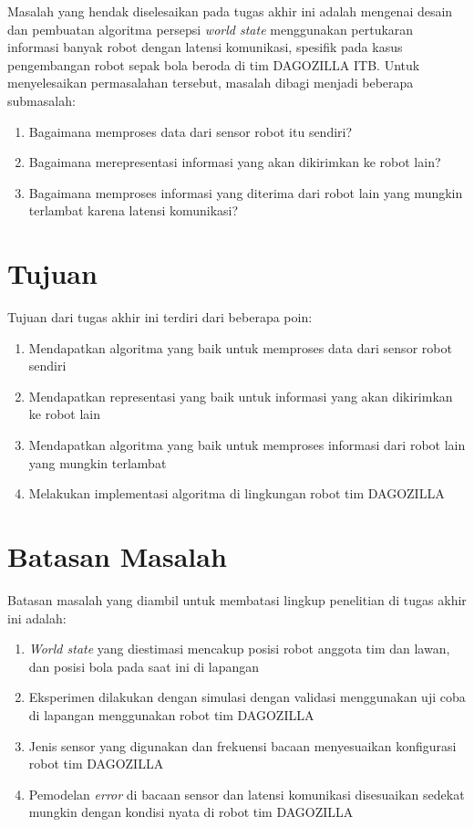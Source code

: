 Masalah yang hendak diselesaikan pada tugas akhir ini adalah mengenai desain dan pembuatan algoritma persepsi \textit{world state} menggunakan pertukaran informasi banyak robot dengan latensi komunikasi, spesifik pada kasus pengembangan robot sepak bola beroda di tim DAGOZILLA ITB. Untuk menyelesaikan permasalahan tersebut, masalah dibagi menjadi beberapa submasalah:

\begin{enumerate}
    \item Bagaimana memproses data dari sensor robot itu sendiri?
    \item Bagaimana merepresentasi informasi yang akan dikirimkan ke robot lain?
    \item Bagaimana memproses informasi yang diterima dari robot lain yang mungkin terlambat karena latensi komunikasi?
\end{enumerate}

\section{Tujuan}

Tujuan dari tugas akhir ini terdiri dari beberapa poin:

\begin{enumerate}
    \item Mendapatkan algoritma yang baik untuk memproses data dari sensor robot sendiri
    \item Mendapatkan representasi yang baik untuk informasi yang akan dikirimkan ke robot lain
    \item Mendapatkan algoritma yang baik untuk memproses informasi dari robot lain yang mungkin terlambat
    \item Melakukan implementasi algoritma di lingkungan robot tim DAGOZILLA
\end{enumerate}

\section{Batasan Masalah}

Batasan masalah yang diambil untuk membatasi lingkup penelitian di tugas akhir ini adalah:

\begin{enumerate}
    \item \textit{World state} yang diestimasi mencakup posisi robot anggota tim dan lawan, dan posisi bola pada saat ini di lapangan
    \item Eksperimen dilakukan dengan simulasi dengan validasi menggunakan uji coba di lapangan menggunakan robot tim DAGOZILLA
    \item Jenis sensor yang digunakan dan frekuensi bacaan menyesuaikan konfigurasi robot tim DAGOZILLA
    \item Pemodelan \textit{error} di bacaan sensor dan latensi komunikasi disesuaikan sedekat mungkin dengan kondisi nyata di robot tim DAGOZILLA
\end{enumerate}

